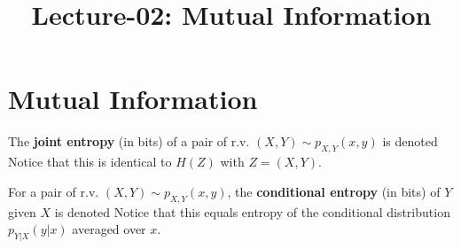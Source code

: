 \documentclass[letterpaper,10pt,english]{article}
\title{Lecture-02: Mutual Information}
\author{}
\begin{document}
\maketitle

\section{Mutual Information}
\begin{defn} 
The \textbf{joint entropy} (in bits) of a pair of r.v. $(X, Y) \sim p_{X,Y}(x, y)$ is denoted
Notice that this is identical to $H(Z)$ with $Z = (X, Y)$.
\end{defn} 
\begin{defn}
For a pair of r.v. $(X, Y) \sim p_{X,Y}(x, y)$, the \textbf{conditional entropy} (in bits) of $Y$ given $X$ is denoted 
Notice that this equals entropy of the conditional distribution $p_{Y|X} (y|x)$ averaged over $x$.
\end{defn}
\end{document}
